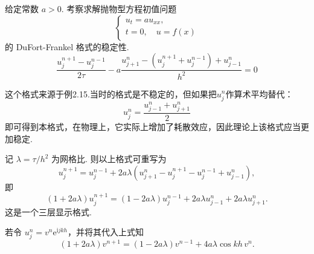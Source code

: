 \begin{instance}
    给定常数 $a > 0$. 考察求解抛物型方程初值问题
    \begin{equation*}
        \begin{cases}
            u_t = a u_{xx}, \\
            t = 0, \quad u = f(x)
        \end{cases}
    \end{equation*}
    的 DuFort-Frankel 格式的稳定性.
    \begin{equation*}
        \frac{u_j^{n+1} - u_j^{n-1}}{2\tau} - a \frac{u_{j+1}^n - (u_j^{n+1} + u_j^{n-1}) + u_{j-1}^n}{h^2} = 0
    \end{equation*}\par
    这个格式来源于例2.15.当时的格式是不稳定的，但如果把$u_j^n$作算术平均替代：
    \begin{equation*}
        u^n_j=\frac{u^n_{j-1}+u^n_{j+1}}{2}
    \end{equation*}
    即可得到本格式，在物理上，它实际上增加了耗散效应，因此理论上该格式应当更加稳定.\par
    \noindent{} 记 $\lambda = \tau/h^2$ 为网格比. 则以上格式可重写为
    \begin{equation*}
        u_j^{n+1} = u_j^{n-1} + 2a\lambda(u_{j+1}^n - u_j^{n+1} - u_j^{n-1} + u_{j-1}^n),
    \end{equation*}
    即
    \begin{equation*}
        (1 + 2a\lambda)u_j^{n+1} = (1 - 2a\lambda)u_j^{n-1} + 2a\lambda u_{j-1}^n + 2a\lambda u_{j+1}^n.
    \end{equation*}
    这是一个三层显示格式.\par
    \noindent{} 若令 $u_j^n = v^n \mathrm{e}^{\mathrm{i} j k h}$，并将其代入上式知
    \begin{equation*}
        (1 + 2a\lambda)v^{n+1} = (1 - 2a\lambda)v^{n-1} + 4a\lambda \cos kh \, v^n.
    \end{equation*}


\end{instance}

